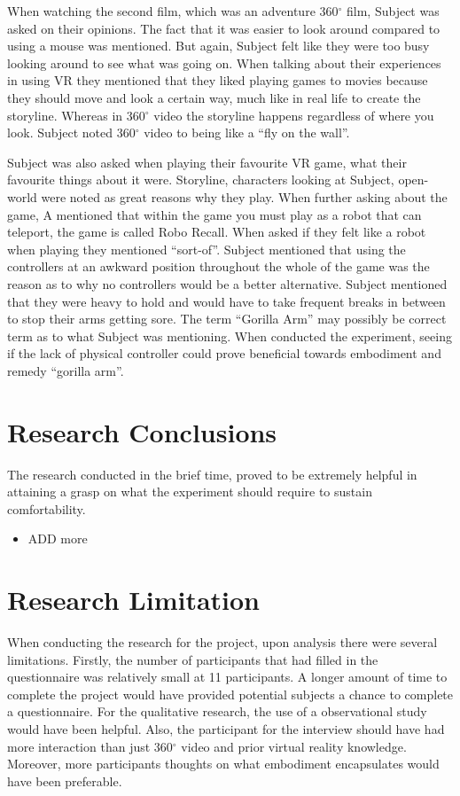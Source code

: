 \documentclass[12pt]{report}
\begin{document}
When watching the second film, which was an adventure 360${}^\circ$ film, Subject was asked on their opinions. The fact that it was easier to look around compared to using a mouse was mentioned. But again, Subject felt like they were too busy looking around to see what was going on. When talking about their experiences in using VR they mentioned that they liked playing games to movies because they should move and look a certain way, much like in real life to create the storyline. Whereas in 360${}^\circ$ video the storyline happens regardless of where you look. Subject noted 360${}^\circ$ video to being like a “fly on the wall”. 

Subject was also asked when playing their favourite VR game, what their favourite things about it were. Storyline, characters looking at Subject, open-world were noted as great reasons why they play. When further asking about the game, A mentioned that within the game you must play as a robot that can teleport, the game is called Robo Recall. When asked if they felt like a robot when playing they mentioned “sort-of”. Subject mentioned that using the controllers at an awkward position throughout the whole of the game was the reason as to why no controllers would be a better alternative. Subject mentioned that they were heavy to hold and would have to take frequent breaks in between to stop their arms getting sore. The term “Gorilla Arm” may possibly be correct term as to what Subject was mentioning. When conducted the experiment, seeing if the lack of physical controller could prove beneficial towards embodiment and remedy “gorilla arm”.

\section{Research Conclusions}
The research conducted in the brief time, proved to be extremely helpful in attaining a grasp on what the experiment should require to sustain comfortability.
 \begin{itemize}
	
	\item ADD more
\end{itemize}

\section{Research Limitation}
When conducting the research for the project, upon analysis there were several limitations. Firstly, the number of participants that had filled in the questionnaire was relatively small at 11 participants. A longer amount of time to complete the project would have provided potential subjects a chance to complete a questionnaire.  For the qualitative research, the use of a observational study would have been helpful.  Also, the participant for the interview should have had more interaction than just 360${}^\circ$ video and prior virtual reality knowledge. Moreover, more participants thoughts on what embodiment encapsulates would have been preferable.
\end{document}
